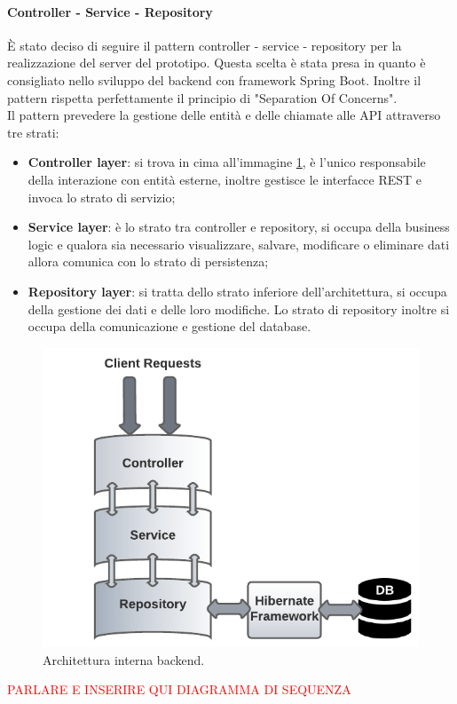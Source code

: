 \paragraph{Controller - Service - Repository}
È stato deciso di seguire il pattern controller - service - repository per la realizzazione del server del prototipo. Questa scelta è stata presa in quanto è consigliato nello sviluppo del backend con framework Spring Boot. Inoltre il pattern rispetta perfettamente il principio di "Separation Of Concerns".\\
Il pattern prevedere la gestione delle entità e delle chiamate alle API attraverso tre strati:
\begin{itemize}
  \item \textbf{Controller layer}: si trova in cima all'immagine \ref{controller-service-repository}, è l'unico responsabile della interazione con entità esterne, inoltre gestisce le interfacce REST e invoca lo strato di servizio;
  \item \textbf{Service layer}: è lo strato tra controller e repository, si occupa della business logic e qualora sia necessario visualizzare, salvare, modificare o eliminare dati allora comunica con lo strato di persistenza;
  \item \textbf{Repository layer}: si tratta dello strato inferiore dell'architettura, si occupa della gestione dei dati e delle loro modifiche. Lo strato di repository inoltre si occupa della comunicazione e gestione del database.
\end{itemize}
\begin{figure}[!h]
\centering
\includegraphics[width=0.8\linewidth]{immagini/controller_service_repository.pdf}
\caption{Architettura interna backend.}
\label{controller-service-repository}
\end{figure}
\textcolor{red}{PARLARE E INSERIRE QUI DIAGRAMMA DI SEQUENZA}
